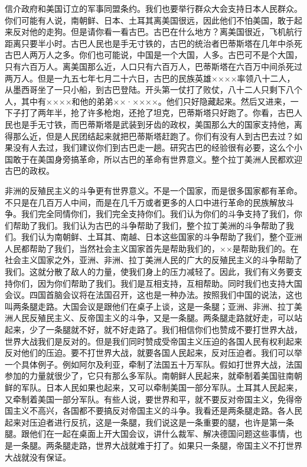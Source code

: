 信介政府和美国订立的军事同盟条约。我们也要举行群众大会支持日本人民群众。你们可能有人说，南朝鲜、日本、土耳其离美国很远，因此他们不怕美国，敢于起来反对他的走狗。但是请你看一看古巴。古巴在什么地方？离美国很近，飞机航行距离只要半小时。古巴人民也是手无寸铁的，古巴的统治者巴蒂斯塔在几年中杀死古巴人两万人之多。你们也可能说，中国是一个大国，人多。古巴可不是个大国，只有六百万人。离美国那么近，人口只有六百万人，巴蒂斯塔在六百万中间杀死过两万人。但是一九五七年七月二十六日，古巴的民族英雄××××率领八十二人，从墨西哥坐了一只小船，到古巴登陆。开头第一仗打了败仗，八十二人只剩下八个人，其中有××××和他的弟弟××·××××。他们只好隐藏起来。然后又进来，一下子打了两年半，抢了许多枪炮，还抢了坦克，巴蒂斯塔只好跑了。你看，古巴人民也是手无寸铁，而巴蒂斯塔是武装到牙齿的政权，美国那么大的国家支持他，离得那么近，但是人民团结起来就把巴蒂斯塔赶跑了。你们有没有人到古巴去过？如果没有人去过，我们建议你们到古巴走一趟。研究古巴的经验很有必要，这么个小国敢于在美国身旁搞革命，所以古巴的革命有世界意义。整个拉丁美洲人民都欢迎古巴的政权。

非洲的反殖民主义的斗争更有世界意义。不是一个国家，而是很多国家都有革命。不只是在几百万人中间，而是在几千万或者更多的人口中进行革命的民族解放斗争。我们完全同情你们，我们完全支持你们。我们认为你们的斗争支持了我们，你们帮助了我们。我们认为古巴的斗争帮助了我们，整个拉丁美洲的斗争帮助了我们。我们认为南朝鲜、土耳其、南越、日本这些国家的斗争帮助了我们，整个亚洲人民都帮助了我们，当然社会主义国家首先是帮助我们的，××是帮助我们的。在社会主义国家之外，亚洲、非洲、拉丁美洲人民的广大的反殖民主义的斗争帮助了我们。这就分散了敌人的力量，使我们身上的压力减轻了。因此，我们有义务要支持你们，因为你们帮助了我们。我们是互相支持，互相帮助。同时我们也支持大国会议。四国首脑会议将在法国召开，这也是一种办法。按照我们中国的说法，这也叫两条腿走路。大国会议是跟他们在桌子上谈，这是一条腿；亚洲、非洲、拉丁美洲人民反殖民主义、反帝国主义的斗争，又是一条腿。两条腿走路就好走，可以站起来，少了一条腿就不好，就不好走路了。我们相信你们也赞成不要打世界大战，世界大战我们是反对的。但是我们同时赞成受帝国主义压迫的各国人民有权利起来反对他们的压迫。要不打世界大战，就要各国人民起来，反对压迫者。我们可以举一个具体例子。例如阿尔及利亚，牵制了法国五十万军队。假如打世界大战，法国参加的力量就很少了，它只有那么多军队。南朝鲜人民起来，就牵制着美国驻南朝鲜的军队。日本人民如果也起来，又可以牵制美国一部分军队。土耳其人民起来，又牵制着美国一部分军队。有些人说，要世界和平，就不要反对帝国主义，免得帝国主义不高兴，各国都不要搞反对帝国主义的斗争。我看还是两条腿走路。各人民起来对压迫者进行反抗，这是一条腿，我们说这是一条重要的腿，也许是第一条腿。跟他们在一起在桌面上开大国会议，讲什么裁军、解决德国问题这些事情，也是一条腿。两条腿走路，世界大战就难于打了。如果只一条腿，帝国主义不打世界大战就没有保证。

